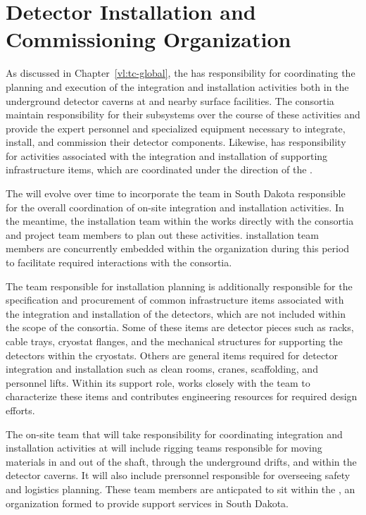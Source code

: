 \chapter{Detector Installation and Commissioning Organization}
\label{ch:tc-jpo}

As discussed in Chapter~\ref{vl:tc-global}, the  has
responsibility for coordinating the planning and execution of 
the  integration and installation activities both 
in the underground detector caverns at  and 
nearby surface facilities.  The  consortia maintain 
responsibility for their subsystems over the course of these 
activities and provide the expert personnel and specialized 
equipment necessary to integrate, install, and commission their 
detector components.  Likewise,  has responsibility 
for activities associated with the integration and installation 
of supporting infrastructure items, which are coordinated under 
the direction of the .       

The  will evolve over time to incorporate the team in South 
Dakota responsible for the overall coordination of on-site integration 
and installation activities.  In the meantime, the installation team 
within the  works directly with the  consortia 
and  project team members to plan out these activities.  
 installation team members are concurrently embedded 
within the   organization during this period to 
facilitate required interactions with the  consortia. 

The  team responsible for installation planning is additionally 
responsible for the specification and procurement of common infrastructure 
items associated with the integration and installation of the detectors, 
which are not included within the scope of the  consortia.  
Some of these items are detector pieces such as racks, cable trays, cryostat 
flanges, and the mechanical structures for supporting the detectors within 
the cryostats.  Others are general items required for detector integration 
and installation such as clean rooms, cranes, scaffolding, and personnel 
lifts.  Within its support role,   works closely with 
the  team to characterize these items and contributes engineering 
resources for required design efforts.

The on-site  team that will take responsibility for coordinating
integration and installation activities at  will include rigging 
teams responsible for moving materials in and out of the shaft, through the 
underground drifts, and within the detector caverns.  It will also include 
prersonnel responsible for overseeing safety and logistics planning.  These 
team members are anticpated to sit within the , an organization 
formed to provide  support services in South Dakota.    

